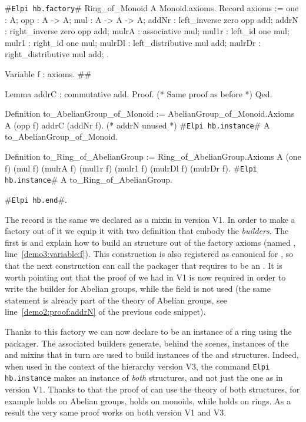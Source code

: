 \documentclass[a4paper,UKenglish,cleveref, autoref]{lipics-v2019}
\newcommand{\mixin}{mixin}
\newcommand{\mixins}{mixins}
\newcommand{\factory}{factory}
\newcommand{\packager}{packager}
\newcommand{\builder}{builder}
\newcommand{\hbfactory}{{\tt\color{dkgreen}Elpi hb.factory}}
\newcommand{\hbinstance}{{\tt\color{dkgreen}Elpi hb.instance}}
\newcommand{\hbend}{{\tt\color{dkgreen}Elpi hb.end}}
\theoremstyle{implem}
\theoremstyle{implem}
\theoremstyle{command}
\begin{document}
\begin{coqcode}
#\hbfactory{}# Ring_of_Monoid A Monoid.axioms.
  Record axioms := {
    one : A;
    opp : A -> A;
    mul : A -> A -> A;
    addNr : left_inverse zero opp add;
    addrN : right_inverse zero opp add;
    mulrA : associative mul;
    mul1r : left_id one mul;
    mulr1 : right_id one mul;
    mulrDl : left_distributive mul add;
    mulrDr : right_distributive mul add;
  }.

  Variable f : axioms.                                                          #\label{demo3:variable:f}#

  Lemma addrC : commutative add.
  Proof. (* Same proof as before *) Qed.

  Definition to_AbelianGroup_of_Monoid :=
    AbelianGroup_of_Monoid.Axioms A (opp f) addrC (addNr f). (* addrN unused *)
  #\hbinstance{}# A to_AbelianGroup_of_Monoid.

  Definition to_Ring_of_AbelianGroup :=
    Ring_of_AbelianGroup.Axioms A (one f) (mul f)
      (mulrA f) (mul1r f) (mulr1 f) (mulrDl f) (mulrDr f).
  #\hbinstance{}# A to_Ring_of_AbelianGroup.

#\hbend{}#.
\end{coqcode}

The record  is the same we declared as a \mixin{}
in version V1. In order to make a \factory{} out of it we equip it with
two definition that embody the \emph{\builder{}s}.
The first is  and
explain how to build an  structure out of the \factory{}
axioms (named , line~\ref{demo3:variable:f}).
This construction is also registered as canonical for ,
so that the next construction  can call
the  \packager{} that requires  to be
an .
It is worth pointing out that the proof of  we had in V1 is now
required in order to write the \builder{} for Abelian groups, while
the  field is not used (the same statement is already part of
the theory of Abelian groups, see line~\ref{demo2:proof:addrN} of the previous
code snippet).

Thanks to this \factory{} we can now declare  to be an instance
of a ring using the  \packager{}.
The associated \builder{}s generate, behind the scenes, instances of the
 and  \mixins{}
that in turn are used to build instances of the  and 
structures. Indeed, when used in the context of the hierarchy version V3,
the command \hbinstance{} 
makes  an instance of \emph{both} structures, and not just the 
one as in version V1.
Thanks to that the proof of  can use the theory of
both structures, for example  holds on Abelian groups,
 holds on monoids, while  holds on rings.
As a result the very same proof works on both
version V1 and V3.
\end{document}
